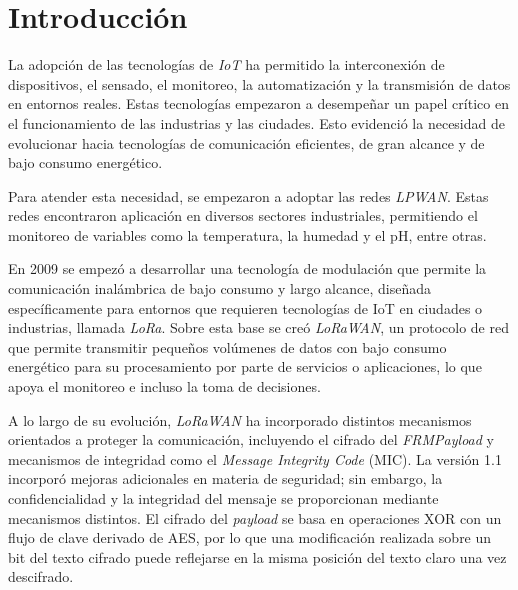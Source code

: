 \chapter{Introducción}

La adopción de las tecnologías de \textit{IoT} ha permitido la interconexión de dispositivos, el sensado, el monitoreo, la automatización y la transmisión de datos en entornos reales. Estas tecnologías empezaron a desempeñar un papel crítico en el funcionamiento de las industrias y las ciudades. Esto evidenció la necesidad de evolucionar hacia tecnologías de comunicación eficientes, de gran alcance y de bajo consumo energético.

Para atender esta necesidad, se empezaron a adoptar las redes \textit{LPWAN}. Estas redes encontraron aplicación en diversos sectores industriales, permitiendo el monitoreo de variables como la temperatura, la humedad y el pH, entre otras.

En 2009 se empezó a desarrollar una tecnología de modulación que permite la comunicación inalámbrica de bajo consumo y largo alcance, diseñada específicamente para entornos que requieren tecnologías de IoT en ciudades o industrias, llamada \textit{LoRa}. Sobre esta base se creó \textit{LoRaWAN}, un protocolo de red que permite transmitir pequeños volúmenes de datos con bajo consumo energético para su procesamiento por parte de servicios o aplicaciones, lo que apoya el monitoreo e incluso la toma de decisiones.

A lo largo de su evolución, \textit{LoRaWAN} ha incorporado distintos mecanismos orientados a proteger la comunicación, incluyendo el cifrado del \textit{FRMPayload} y mecanismos de integridad como el \textit{Message Integrity Code} (MIC). La versión 1.1 incorporó mejoras adicionales en materia de seguridad; sin embargo, la confidencialidad y la integridad del mensaje se proporcionan mediante mecanismos distintos. El cifrado del \textit{payload} se basa en operaciones XOR con un flujo de clave derivado de AES, por lo que una modificación realizada sobre un bit del texto cifrado puede reflejarse en la misma posición del texto claro una vez descifrado.

